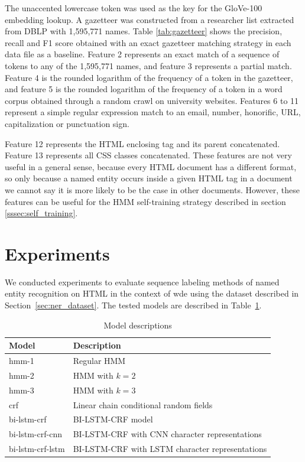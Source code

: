 \documentclass{nle}
\begin{document}
The unaccented lowercase token was used as the key for the GloVe-100 embedding lookup.
A gazetteer was constructed from a researcher list extracted from DBLP with 1,595,771
names. Table \ref{tab:gazetteer} shows the precision, recall and F1 score obtained with an
exact gazetteer matching strategy in each data file as a baseline.
Feature 2 represents an exact match of a sequence of tokens to any of the 1,595,771 
names, and feature 3 represents a partial match. Feature 4 is the rounded logarithm of 
the frequency of a token in the gazetteer, and feature 5 is the rounded logarithm of the frequency
of a token in a word corpus obtained through a random crawl on university websites.
Features 6 to 11 represent a simple regular expression match to an email, number, 
honorific, URL, capitalization or punctuation sign.

Feature 12 represents the HTML enclosing tag and its parent concatenated. Feature 13
represents all CSS classes concatenated. These features are not very useful in a general
sense, because every HTML document has a different format, so only because a named entity
occurs inside a given HTML tag in a document we cannot say it is more likely to be the case 
in other documents. However, these features can be useful for the HMM self-training strategy 
described in section \ref{sssec:self_training}. 

\section{Experiments}

We conducted experiments to evaluate sequence labeling methods of named entity 
recognition on HTML in the context of \gls{wde} using the dataset 
described in Section~\ref{sec:ner_dataset}. The tested models are described in
Table~\ref{tab:models}.

\begin{table}[h]
  \small
  \begin{center}
    \begin{tabular}{ ll }
      \toprule
      Model & Description \\
      \midrule
      hmm-1            & Regular HMM \\
      hmm-2            & HMM with $ k=2 $ \\
      hmm-3            & HMM with $ k=3 $ \\
      crf              & Linear chain conditional random fields \\
      bi-lstm-crf      & BI-LSTM-CRF model \\
      bi-lstm-crf-cnn  & BI-LSTM-CRF with CNN character representations \\
      bi-lstm-crf-lstm & BI-LSTM-CRF with LSTM character representations \\
      \bottomrule
    \end{tabular}
  \end{center}
  \caption{Model descriptions}
  \label{tab:models}
\end{table}
\end{document}
